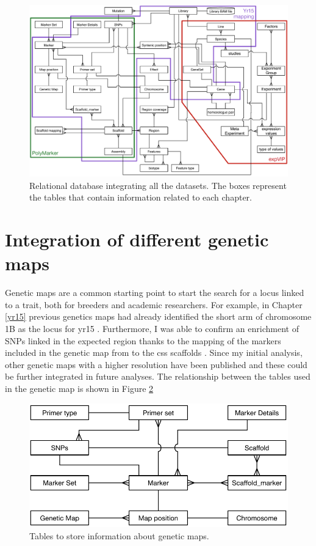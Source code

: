\begin{figure}
\includegraphics[width=1\textwidth]{Conclusions/Figures/CompleteDatabase.pdf}
\caption[Relational database integrating all the datasets.]{Relational database integrating all the datasets. The boxes represent the tables that contain information related to each chapter.}
\label{fig:discussion:allTables}
\end{figure}


\section{Integration of different genetic maps}

Genetic maps are a common starting point to start the search for a locus linked to a trait, both for breeders and academic researchers. 
For example, in Chapter \ref{yr15} previous genetics maps had already identified the short arm of chromosome 1B as the locus for \acrshort{yr15} \citep{Murphy2009}.
Furthermore, I was able to confirm an enrichment of SNPs linked in the expected region thanks to the mapping of the markers included in the genetic map from \citet{Wang2014} to the \acrshort{css} scaffolds \citep{Mayer2014}. Since my initial analysis, other genetic maps with a higher resolution have been published \citep{Chapman2015, Allen2016,Winfield2016} and these could be further integrated in future analyses. 
The relationship between the tables used in the genetic map is shown in Figure \ref{fig:discussion:geneticMapsTables}

\begin{figure}
\includegraphics[width=1\textwidth]{Conclusions/Figures/GenetiMapTables.pdf}
\caption{Tables to store information about genetic maps.}
\label{fig:discussion:geneticMapsTables}
\end{figure}

